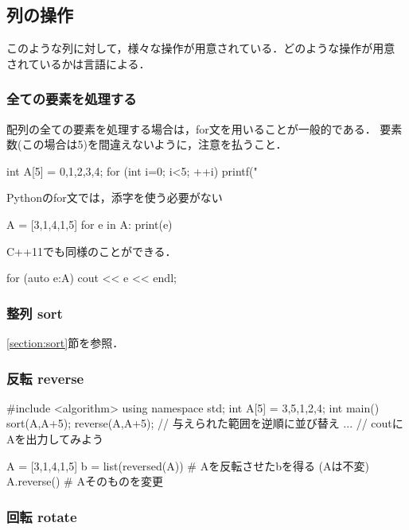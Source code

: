 \subsection{列の操作}
このような列に対して，様々な操作が用意されている．どのような操作が用意
されているかは言語による．

\subsubsection{全ての要素を処理する}

配列の全ての要素を処理する場合は，for文を用いることが一般的である．
要素数(この場合は5)を間違えないように，注意を払うこと．
\begin{cbox}[emph={5}]
int A[5] = {0,1,2,3,4};
for (int i=0; i<5; ++i)
  printf("
\end{cbox}

Pythonのfor文では，添字を使う必要がない
\begin{pybox}
A = [3,1,4,1,5]
for e in A:
  print(e)
\end{pybox}

C++11でも同様のことができる．
\begin{c11box}[emph={auto}]
for (auto e:A) cout << e << endl;  
\end{c11box}


\subsubsection{整列 sort}

\ref{section:sort}節を参照．

\subsubsection{反転 reverse}

\begin{cbox}
#include <algorithm>
using namespace std;
int A[5] = {3,5,1,2,4};
int main() {
   sort(A,A+5);
   reverse(A,A+5); // 与えられた範囲を逆順に並び替え
   ...  // coutにAを出力してみよう
}
\end{cbox}

\begin{pybox}
A = [3,1,4,1,5]
b = list(reversed(A)) # Aを反転させたbを得る (Aは不変)
A.reverse()   # Aそのものを変更
\end{pybox}

\subsubsection{回転 rotate}

